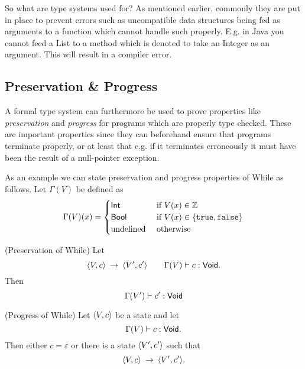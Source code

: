 So what are type systems used for? As mentioned earlier, commonly they are put
in place to prevent errors such as uncompatible data structures being fed as arguments
to a function which cannot handle such properly. E.g. in Java you cannot feed a
List to a method which is denoted to take an Integer as an argument. This will
result in a compiler error.

\subsection{Preservation \& Progress}
\label{sub:preservation_&_progress}

A formal type system can furthermore be used to prove properties like
\emph{preservation} and \emph{progress} for programs which are properly type
checked. These are important properties since they can beforehand ensure that
programs terminate properly, or at least that e.g. if it terminates erroneously it
must have been the result of a null-pointer exception.

As an example we can state preservation and progress properties of While as follows. Let
$\Gamma(V)$ be defined as 
\[
  \Gamma(V)(x) = \begin{cases}
    \mbox{$\mathsf{Int}$} & \text{ if } V(x) \in \mathbb{Z} \\
    \mbox{$\mathsf{Bool}$} & \text{ if } V(x) \in \left\{\mbox{\texttt{true}}, \mbox{\texttt{false}} \right\} \\
    \text{undefined} & \text{ otherwise }
  \end{cases}
\]
\begin{proposition}{(Preservation of While)} 
  Let
  \begin{equation*}
    \langle V, c \rangle \: \rightarrow \: \langle V', c' \rangle \quad\quad \Gamma(V) \vdash
    c: \mbox{$\mathsf{Void}$}.
  \end{equation*}
  Then 
  \begin{equation}
    \Gamma(V') \vdash c': \mbox{$\mathsf{Void}$}
  \end{equation}
\end{proposition}
\begin{proposition}{(Progress of While)}
  Let $\langle V, c \rangle$ be a state and let
  \begin{equation*}
    \Gamma(V) \vdash c: \mbox{$\mathsf{Void}$}.
  \end{equation*}
  Then either $c = \varepsilon$ or there is a state $\langle V', c' \rangle$ such that
  \begin{equation*}
    \langle V, c \rangle \: \rightarrow \: \langle V', c' \rangle.
  \end{equation*}
\end{proposition}


